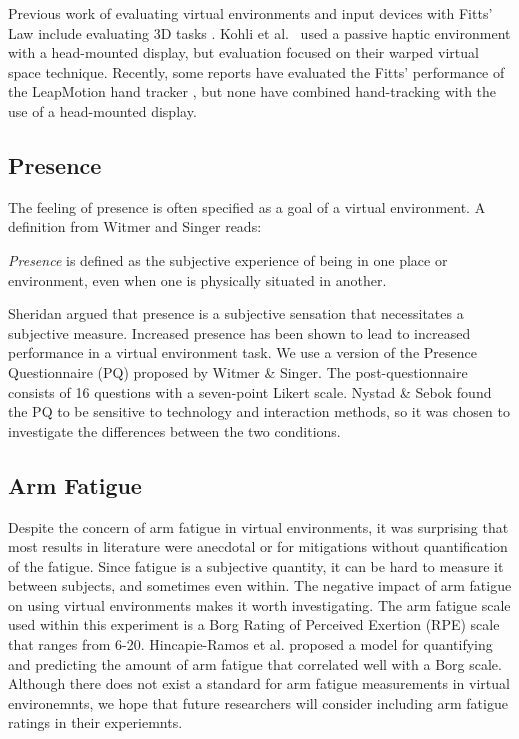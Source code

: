Previous work of evaluating virtual environments and input devices with Fitts’ Law include evaluating 3D tasks \cite{chun_evaluating_2004,liu_comparing_2009,teather_evaluating_2010}.
Kohli et al.\ \cite{kohli_redirected_2012} used a passive haptic environment with a head-mounted display, but evaluation focused on their warped virtual space technique.
Recently, some reports have evaluated the Fitts’ performance of the LeapMotion hand tracker \cite{coelho_pointing_2014,seixas_one_2015}, but none have combined hand-tracking with the use of a head-mounted display.

\subsection{Presence}

The feeling of presence is often specified as a goal of a virtual environment.
A definition from Witmer and Singer\cite{witmer_measuring_1998} reads:
\begin{displayquote}
\textit{Presence} is defined as the subjective experience of being in one place or environment, even when one is physically situated in another.
\end{displayquote}
Sheridan \cite{sheridan_musings_1992} argued that presence is a subjective sensation that necessitates a subjective measure.
Increased presence has been shown to lead to increased performance in a virtual environment task\cite{youngblut_relationship_2003}.
We use a version of the Presence Questionnaire (PQ) proposed by Witmer \& Singer\cite{witmer_measuring_1998}.
The post-questionnaire consists of 16 questions with a seven-point Likert scale.
Nystad \& Sebok \cite{nystad_comparison_2004} found the PQ to be sensitive to technology and interaction methods, so it was chosen to investigate the differences between the two conditions.

\subsection{Arm Fatigue}

Despite the concern of arm fatigue in virtual environments\cite{burdea_virtual_2003}, it was surprising that most results in literature were anecdotal or for mitigations without quantification of the fatigue.
Since fatigue is a subjective quantity, it can be hard to measure it between subjects, and sometimes even within.
The negative impact of arm fatigue on using virtual environments makes it worth investigating.
The arm fatigue scale used within this experiment is a Borg Rating of Perceived Exertion (RPE) scale that ranges from 6-20\cite{borg_borgs_1998}.
Hincapie-Ramos et al.\cite{hincapie-ramos_consumed_2014} proposed a model for quantifying and predicting the amount of arm fatigue that correlated well with a Borg scale.
Although there does not exist a standard for arm fatigue measurements in virtual environemnts, we hope that future researchers will consider including arm fatigue ratings in their experiemnts.

